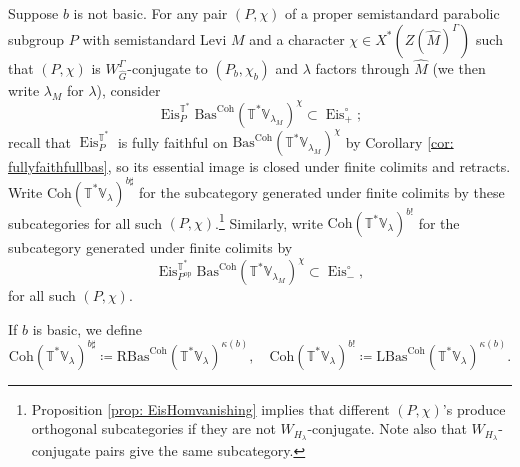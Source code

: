 \documentclass{amsart}
\theoremstyle{definition}
\theoremstyle{remark}
\numberwithin{equation}{section}
\newcommand{\op}{\mathrm{op}}
\newcommand{\wh}{\widehat}
\DeclareMathOperator{\Eis}{\mathrm{Eis}}
\newcommand{\Coh}{\mathrm{Coh}}
\newcommand{\V}{\mathbb{V}}
\newcommand{\T}{\mathbb{T}}
\newcommand{\RBas}{\mathrm{RBas}}
\newcommand{\LBas}{\mathrm{LBas}}
\newcommand{\Bas}{\mathrm{Bas}}
\begin{document}
Suppose $b$ is not basic. For any pair $(P, \chi)$ of a proper semistandard parabolic subgroup $P$ with semistandard Levi $M$ and a character $\chi\in X^*(Z(\wh M)^\Gamma)$ such that $(P, \chi)$ is $W_{\wh G}^\Gamma$-conjugate to $(P_b,\chi_b)$ and $\lambda$ factors through $\wh M$ (we then write $\lambda_M$ for $\lambda$), consider
\[
\Eis_{P}^{\T^*} \Bas^\Coh(\T^*\V_{\lambda_M})^{\chi} \subset \Eis^{\circ}_+;
\]
recall that $\Eis_{P}^{\T^*}$ is fully faithful on $\Bas^\Coh(\T^*\V_{\lambda_M})^{\chi}$ by Corollary \ref{cor: fullyfaithfullbas}, so its essential image is closed under finite colimits and retracts. 
Write $\Coh(\T^*\V_\lambda)^{b\sharp}$ for the subcategory generated under finite colimits by these subcategories for all such 
$(P,\chi)$.\footnote{Proposition \ref{prop: EisHomvanishing} implies that different $(P,\chi)$'s produce orthogonal subcategories if they are not $W_{H_\lambda}$-conjugate. Note also that $W_{H_\lambda}$-conjugate pairs give the same subcategory.} Similarly, write $\Coh(\T^*\V_\lambda)^{b!}$ for the subcategory generated under finite colimits by
\[
\Eis^{\T^{\ast}}_{P^\op} \Bas^\Coh(\T^*\V_{\lambda_M})^{\chi}\subset \Eis^{\circ}_-,
\]
for all such $(P,\chi)$. 

If $b$ is basic, we define
\begin{equation*}
    \Coh(\T^{\ast}\V_\lambda)^{b\sharp}\coloneq \RBas^\Coh(\T^*\V_\lambda)^{\kappa(b)}, \quad  \Coh(\T^{\ast}\V_\lambda)^{b!}\coloneq \LBas^\Coh(\T^*\V_\lambda)^{\kappa(b)}. 
\end{equation*}
\end{document}
